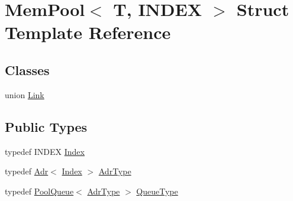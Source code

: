 \hypertarget{structMemPool}{\section{Mem\-Pool$<$ T, I\-N\-D\-E\-X $>$ Struct Template Reference}
\label{structMemPool}
}
\subsection*{Classes}
\begin{DoxyCompactItemize}
\item 
union \hyperlink{unionMemPool_1_1Link}{Link}
\end{DoxyCompactItemize}
\subsection*{Public Types}
\begin{DoxyCompactItemize}
\item 
typedef I\-N\-D\-E\-X \hyperlink{structMemPool_adf9fcd1cb44028899c45761a29b7d43f}{Index}
\item 
typedef \hyperlink{structAdr}{Adr}$<$ \hyperlink{structMemPool_adf9fcd1cb44028899c45761a29b7d43f}{Index} $>$ \hyperlink{structMemPool_a62addfe04ad9f092442cf86863f52fcc}{Adr\-Type}
\item 
typedef \hyperlink{structPoolQueue}{Pool\-Queue}$<$ \hyperlink{structMemPool_a62addfe04ad9f092442cf86863f52fcc}{Adr\-Type} $>$ \hyperlink{structMemPool_a6044c1fc80a16b30462127a56e47ab98}{Queue\-Type}
\end{DoxyCompactItemize}
